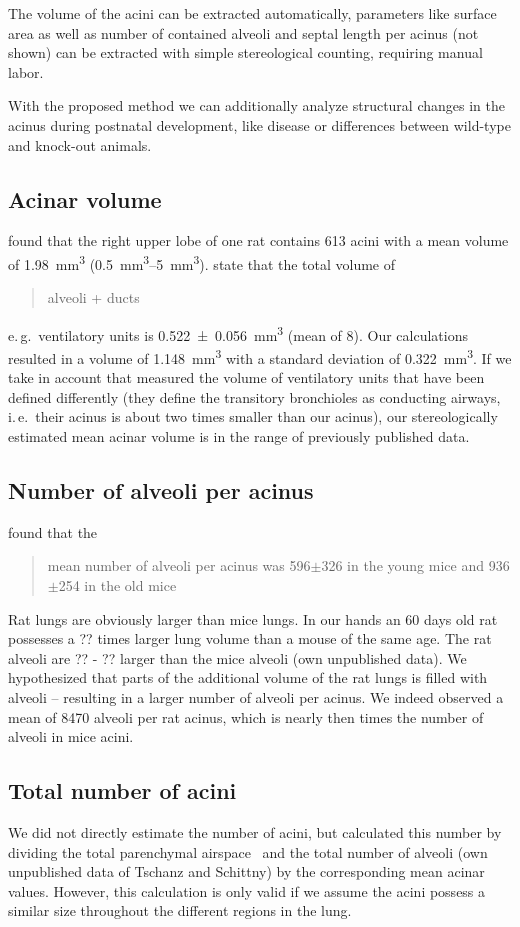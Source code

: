 \documentclass[a4paper,DIV=calc,abstract,english]{scrartcl}
\newcommand{\ie}{i.\,e.\ }
\newcommand{\eg}{e.\,g.\ }
\newcommand{\meanacinarvolume}{1.148} %
\newcommand{\meanacinarvolumeSTD}{0.322} %
\newcommand{\meannumberofalveoli}{8470} %
\begin{document}
The volume of the acini can be extracted automatically, parameters like surface area as well as number of contained alveoli and septal length per acinus (not shown) can be extracted with simple stereological counting, requiring manual labor.

With the proposed method we can additionally analyze structural changes in the acinus during postnatal development, like disease or differences between wild-type and knock-out animals.

\subsection{Acinar volume}
\citet{Rodriguez1987} found that the right upper lobe of one rat contains 613 acini with a mean volume of \SI{1.98}{\milli\meter\cubed} (\SIrange{0.5}{5}{\milli\meter\cubed}).
\citet{Mercer1987a} state that the total volume of \blockquote{alveoli + ducts} \eg ventilatory units is \SI{0.522(56)}{\milli\meter\cubed} (mean of 8). %
Our calculations resulted in a volume of \SI{\meanacinarvolume}{\milli\meter\cubed} with a standard deviation of \SI{\meanacinarvolumeSTD}{\milli\meter\cubed}.
If we take in account that \citep{Mercer1987a} measured the volume of ventilatory units that have been defined differently (they define the transitory bronchioles as conducting airways, \ie their acinus is about two times smaller than our acinus), our stereologically estimated mean acinar volume is in the range of previously published data.

\subsection{Number of alveoli per acinus}
\citet{Vasilescu2012} found that the \blockquote{mean number of alveoli per acinus was 596\(\pm\)326 in the young mice and 936\(\pm\)254 in the old mice}.
Rat lungs are obviously larger than mice lungs.
In our hands  an 60 days old rat possesses a ?? times larger lung volume than a mouse of the same age.
The rat alveoli are ?? - ?? larger than the mice alveoli (own unpublished data). We hypothesized that parts of the additional volume of the rat lungs is filled with alveoli – resulting in a larger number of alveoli per acinus.
We indeed observed a mean of \meannumberofalveoli\xspace alveoli per rat acinus, which is nearly then times the number of alveoli in mice acini. 

\subsection{Total number of acini}
We did not directly estimate the number of acini, but calculated this number by dividing the total parenchymal airspace~\citep{Tschanz2003} and the total number of alveoli (own unpublished data of Tschanz and Schittny) by the corresponding mean acinar values. However, this calculation is  only valid if we assume the acini possess a similar size throughout the different regions in the lung.
\end{document}
